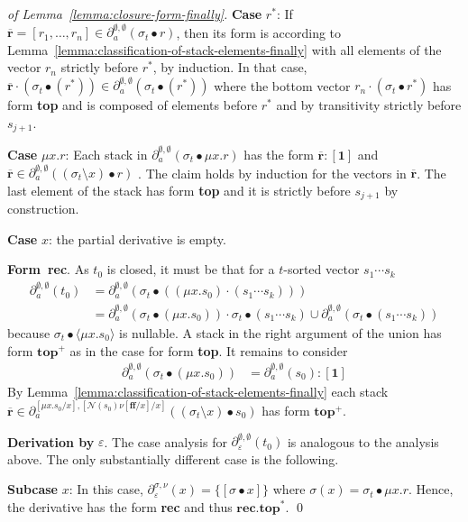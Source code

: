 \documentclass[runningheads, envcountsame, a4paper]{llncs}
\newcommand{\False}{\ensuremath{\mathbf{ff}}}%
\newcommand\pderiv[3][{}]{\partial^{#1}_{#3}(#2)}
\newcommand\Angle[1]{\langle#1\rangle}
\newcommand\Rnull{\mathbf0}
\newcommand\Rempty{\mathbf1}
\newcommand\PUSH{:}
\newcommand\SINGLETON[1]{{[#1]}}
\newcommand\Null{\mathcal{N}}
\newcommand\RS{\ensuremath{\overline{\mathbf{r}}}}
\newcommand\ApplySubst[2]{#1 \bullet #2} %
\begin{document}
\begin{proof}[of Lemma~\ref{lemma:closure-form-finally}]
  \textbf{Case }$r^*$: If  $\RS = [r_1,\dots,r_n] \in
  \pderiv[\emptyset,\emptyset]{\ApplySubst{\sigma_t}r}a$, then its
  form is according to
  Lemma~\ref{lemma:classification-of-stack-elements-finally} with all elements
  of the vector $r_n$ strictly before $r^*$, by induction.
  In that case, $\RS
  \cdot (\ApplySubst{\sigma_t}{(r^*)}) \in
  \pderiv[\emptyset,\emptyset]{\ApplySubst{\sigma_t}{(r^*)}}a$
  where the bottom vector $r_n \cdot  (\ApplySubst{\sigma_t}r^*)$ has
  form \textbf{top} and is
  composed of elements before $r^*$ and by transitivity
  strictly before $s_{j+1}$.

  \textbf{Case }$\mu x.r$:
  Each stack in
  $\pderiv[\emptyset,\emptyset]{\ApplySubst{\sigma_t}{\mu x.r}}a$ has
  the form  $\RS \PUSH \SINGLETON\Rempty$ and $\RS \in
  \pderiv[\emptyset,\emptyset]{\ApplySubst{(\sigma_t \setminus x)}{r}}a$ .
  The claim holds by induction for the vectors in $\RS$. The last element of the stack has form
  \textbf{top} and it is strictly before $s_{j+1}$ by construction.

  \textbf{Case }$x$: the partial derivative is empty.

  \textbf{Form~rec}.
  As $t_0$ is closed, it must be that for a $t$-sorted vector $s_1\cdots s_k$
  \begin{align*}
    \pderiv[\emptyset,\emptyset]{t_0}a
    &= \pderiv[\emptyset,\emptyset]{\ApplySubst{\sigma_t}{(({\mu x.s_0}) \cdot (s_1\cdots s_k))}}a \\
    &=
    \pderiv[\emptyset,\emptyset]{\ApplySubst{\sigma_t}{({\mu x.s_0})}}a  \cdot \ApplySubst{\sigma_t}(s_1\cdots s_k)
    \cup \pderiv[\emptyset,\emptyset]{\ApplySubst{\sigma_t}{(s_1\cdots s_k)}}a 
  \end{align*}
  because $\ApplySubst{\sigma_t}{\Angle{\mu x.s_0}}$ is nullable.
  A stack in the right argument of the union has form $\mathbf{top}^+$ as in the case
  for form \textbf{top}. It remains to consider 
  \begin{align*}
    \pderiv[\emptyset,\emptyset]{\ApplySubst{\sigma_t}{({\mu x.s_0})}}a
    &= \pderiv[\emptyset,\emptyset]{s_0}{a}
                                      \PUSH
                                      \SINGLETON\Rempty
  \end{align*}
  By Lemma~\ref{lemma:classification-of-stack-elements-finally} each stack 
  $\RS \in \pderiv[{[\mu x.s_0/x]}, {[\Null
    (s_0)\nu[\False/x]/x]}]{\ApplySubst{(\sigma_t \setminus x)}s_0}{a}$ has form
  $\mathbf{top}^+$.

  \textbf{Derivation by }$\varepsilon$. The case analysis for
  $\pderiv[\emptyset,\emptyset]{t_0}\varepsilon$ is analogous to the
  analysis above. The only substantially  different case is the following.

  \textbf{Subcase }$x$: In this case,
  $\pderiv[\sigma,\nu]{x}\varepsilon = \{ \SINGLETON{\ApplySubst\sigma
    x} \}$ where $\sigma (x) = \ApplySubst{\sigma_t}{\mu x.r}$. Hence,
  the derivative has the form \textbf{rec} and thus $\mathbf{rec}.\mathbf{top}^*$.
  \qed
\end{proof}
\end{document}
